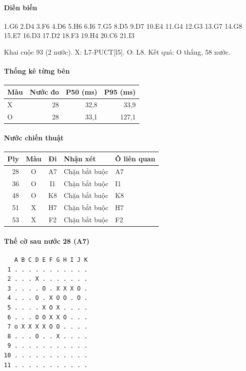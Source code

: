 \paragraph{Diễn biến}
{\footnotesize 1.G6 2.D4 3.F6 4.D6 5.H6 6.I6 7.G5 8.D5 9.D7 10.E4 11.G4 12.G3 13.G7 14.G8 15.E7 16.D3 17.D2 18.F3 19.H4 20.C6 21.I3\par}
Khai cuộc 93 (2 nước). X: L7-PUCT[l5]. O: L8. Kết quả: O thắng, 58 nước.
\paragraph{Thống kê từng bên}
\begin{center}\small
\begin{tabular}{@{}lrrr@{}}
\toprule
Màu & Nước đo & P50 (ms) & P95 (ms) \\
\midrule
X & 28 & 32,8 & 33,9 \\
O & 28 & 33,1 & 127,1 \\
\bottomrule
\end{tabular}
\end{center}
\paragraph{Nước chiến thuật}
\begin{center}\small
\begin{tabular}{@{}rccll@{}}
\toprule
Ply & Màu & Đi & Nhận xét & Ô liên quan \\
\midrule
28 & O & A7 & Chặn bắt buộc & A7 \\
36 & O & I1 & Chặn bắt buộc & I1 \\
48 & O & K8 & Chặn bắt buộc & K8 \\
51 & X & H7 & Chặn bắt buộc & H7 \\
53 & X & F2 & Chặn bắt buộc & F2 \\
\bottomrule
\end{tabular}
\end{center}
\paragraph{Thế cờ sau nước 28 (A7)}
\begin{verbatim}
   A B C D E F G H I J K
 1 . . . . . . . . . . .
 2 . . . X . . . . . . .
 3 . . . . O . X X X O .
 4 . . . O . X O O . O .
 5 . . . . X O X . . . .
 6 . . . O O X X O . . .
 7 o X X X X O O . . . .
 8 . . . O . . X . . . .
 9 . . . . . . . . . . .
10 . . . . . . . . . . .
11 . . . . . . . . . . .
\end{verbatim}
